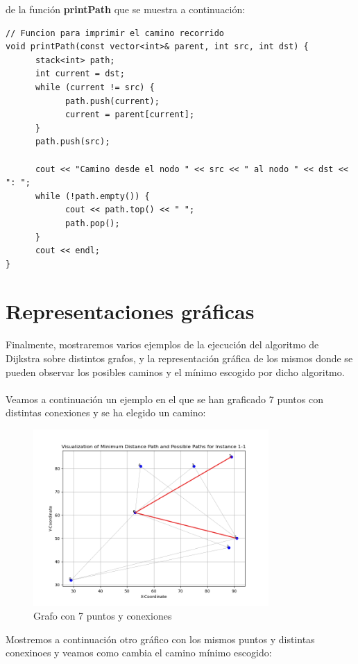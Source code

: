 \documentclass[11pt,openany]{book}
\begin{document}
de la función \textbf{printPath} que se muestra a continuación:
\begin{lstlisting}
// Funcion para imprimir el camino recorrido
void printPath(const vector<int>& parent, int src, int dst) {
      stack<int> path;
      int current = dst;
      while (current != src) {
            path.push(current);
            current = parent[current];
      }
      path.push(src);

      cout << "Camino desde el nodo " << src << " al nodo " << dst << ": ";
      while (!path.empty()) {
            cout << path.top() << " ";
            path.pop();
      }
      cout << endl;
}
\end{lstlisting}

\section{Representaciones gráficas}
Finalmente, mostraremos varios ejemplos de la ejecución del algoritmo de Dijkstra sobre distintos grafos, y la representación gráfica de los mismos
 donde se pueden observar los posibles caminos y el mínimo escogido por dicho algoritmo.\\ \\
Veamos a continuación un ejemplo en el que se han graficado 7 puntos con distintas conexiones y se ha elegido un camino:
\begin{figure}[H]
      \centering
      \includegraphics[width=0.8\textwidth]{assets/Img/GraficaCaminoMinimo-1-1.png}
      \caption{Grafo con 7 puntos y conexiones}
\end{figure}
Mostremos a continuación otro gráfico con los mismos puntos y distintas conexinoes y veamos como cambia el camino
mínimo escogido:
\end{document}
